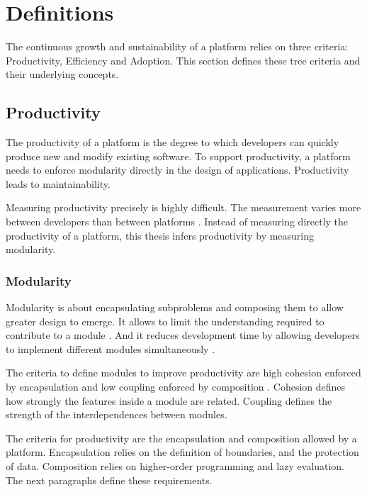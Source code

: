 \section{Definitions} \label{chapter3:definitions}

The continuous growth and sustainability of a platform relies on three criteria: Productivity, Efficiency and Adoption.
This section defines these tree criteria and their underlying concepts.

\subsection{Productivity} \label{chapter3:definitions:productivity}

The productivity of a platform is the degree to which developers can quickly produce new and modify existing software.
To support productivity, a platform needs to enforce modularity directly in the design of applications.
Productivity leads to maintainability.

Measuring productivity precisely is highly difficult.
The measurement varies more between developers than between platforms \cite{Sackman1968}.
Instead of measuring directly the productivity of a platform, this thesis infers productivity by measuring modularity.

\subsubsection{Modularity} \label{chapter3:definitions:productivity:modularity}

Modularity is about encapsulating subproblems and composing them to allow greater design to emerge.
It allows to limit the understanding required to contribute to a module \cite{Stevens1974}.
And it reduces development time by allowing developers to implement different modules simultaneously \cite{Wong2009,Cataldo2006}.

The criteria to define modules to improve productivity are high cohesion enforced by encapsulation and low coupling enforced by composition \cite{Stevens1974}.
Cohesion defines how strongly the features inside a module are related.
Coupling defines the strength of the interdependences between modules.

\separator

The criteria for productivity are the encapsulation and composition allowed by a platform.
Encapsulation relies on the definition of boundaries, and the protection of data.
Composition relies on higher-order programming and lazy evaluation.
The next paragraphs define these requirements.

